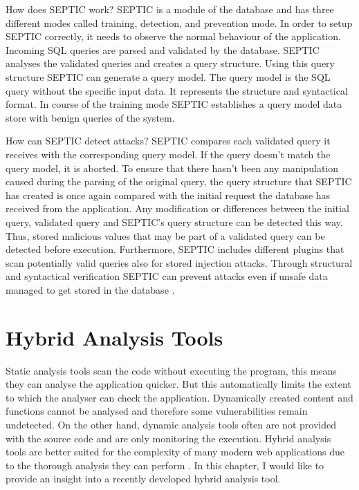How does SEPTIC work? SEPTIC is a module of the database and has three different modes called training, detection, and prevention mode. In order to setup SEPTIC correctly, it needs to observe the normal behaviour of the application. Incoming SQL queries are parsed and validated by the database. SEPTIC analyses the validated queries and creates a query structure. Using this query structure SEPTIC can generate a query model. The query model is the SQL query without the specific input data. It represents the structure and syntactical format. In course of the training mode SEPTIC establishes a query model data store with benign queries of the system\autocite[1169-1172]{Medeiros2019}.\newline


How can SEPTIC detect attacks? SEPTIC compares each validated query it receives with the corresponding query model. If the query doesn't match the query model, it is aborted. To ensure that there hasn't been any manipulation caused during the parsing of the original query, the query structure that SEPTIC has created is once again compared with the initial request the database has received from the application. Any modification or differences between the initial query, validated query and SEPTIC's query structure can be detected this way. Thus, stored malicious values that may be part of a validated query can be detected before execution. Furthermore, SEPTIC includes different plugins that scan potentially valid queries also for stored injection attacks. Through structural and syntactical verification SEPTIC can prevent attacks even if unsafe data managed to get stored in the database \autocite[1173-1175]{Medeiros2019}.

\section{Hybrid Analysis Tools}
 Static analysis tools scan the code without executing the program, this means they can analyse the application quicker. But this automatically limits the extent to which the analyser can check the application. Dynamically created content and functions cannot be analysed and therefore some vulnerabilities remain undetected. On the other hand, dynamic analysis tools often are not provided with the source code and are only monitoring the execution. Hybrid analysis tools are better suited for the complexity of many modern web applications due to the thorough analysis they can perform \autocite[]{Araujo2018, Jahanshahi2018}. In this chapter, I would like to provide an insight into a recently developed hybrid analysis tool.\newline


